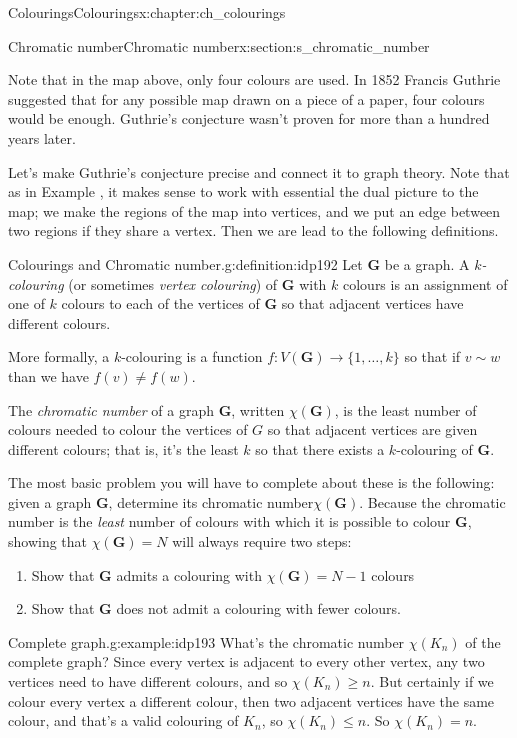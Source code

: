 \documentclass[oneside,10pt,]{book}
\numberwithin{equation}{section}
\newcommand{\bfG}{\mathbf{G}}
\begin{document}
\begin{chapterptx}{Colourings}{}{Colourings}{}{}{x:chapter:ch_colourings}
\begin{sectionptx}{Chromatic number}{}{Chromatic number}{}{}{x:section:s_chromatic_number}
\begin{figureptx}
\begin{image}{0.15}{0.7}{0.15}
\end{image}%
\tcblower
\end{figureptx}%
Note that in the map above, only four colours are used.  In 1852 Francis Guthrie suggested that for any possible map drawn on a piece of a paper, four colours would be enough.  Guthrie's conjecture wasn't proven for more than a hundred years later.%
\par
Let's make Guthrie's conjecture precise and connect it to graph theory.  Note that as in Example , it makes sense to work with essential the dual picture to the map; we make the regions of the map into vertices, and we put an edge between two regions if they share a vertex.  Then we are lead to the following definitions.%
\begin{definition}{Colourings and Chromatic number.}{g:definition:idp192}%
Let \(\bfG\) be a graph.  A \emph{\(k\)-colouring} (or sometimes \emph{vertex colouring}) of \(\bfG\) with \(k\) colours is an assignment of one of \(k\) colours to each of the vertices of \(\bfG\) so that adjacent vertices have different colours.%
\par
More formally, a \(k\)-colouring is a function \(f:V(\bfG)\to\{1,\dots,k\}\) so that if \(v\sim w\) than we have \(f(v)\neq f(w)\).%
\par
The \emph{chromatic number} of a graph \(\bfG\), written \(\chi(\bfG)\), is the least number of colours needed to colour the vertices of \(G\) so that adjacent vertices are given different colours; that is, it's the least \(k\) so that there exists a \(k\)-colouring of \(\bfG\).%
\end{definition}
The most basic problem you will have to complete about these is the following: given a graph \(\bfG\), determine its chromatic number\(\chi(\bfG)\).  Because the chromatic number is the \emph{least} number of colours with which it is possible to colour \(\bfG\), showing that \(\chi(\bfG)=N\) will always require two steps:%
%
\begin{enumerate}
\item{}Show that \(\bfG\) admits a colouring with \(\chi(\bfG)=N-1\) colours%
\item{}Show that \(\bfG\) does not admit a colouring with fewer colours.%
\end{enumerate}
\begin{example}{Complete graph.}{g:example:idp193}%
What's the chromatic number \(\chi(K_n)\) of the complete graph?  Since every vertex is adjacent to every other vertex, any two vertices need to have different colours, and so \(\chi(K_n)\geq n\).  But certainly if we colour every vertex a different colour, then two adjacent vertices have the same colour, and that's a valid colouring of \(K_n\), so \(\chi(K_n)\leq n\).   So \(\chi(K_n)=n\).%

\end{example}
\end{sectionptx}
\end{chapterptx}
\end{document}
